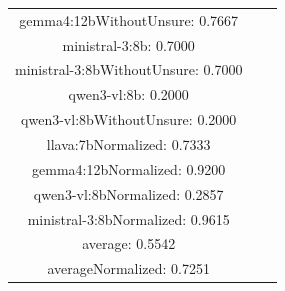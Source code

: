 \documentclass[a4paper]{article}
\begin{document}
\begin{tabular}{ccc}
gemma4:12bWithoutUnsure: 0.7667 \\ ministral-3:8b: 0.7000 \\ ministral-3:8bWithoutUnsure: 0.7000 \\ qwen3-vl:8b: 0.2000 \\ qwen3-vl:8bWithoutUnsure: 0.2000 \\ llava:7bNormalized: 0.7333 \\ gemma4:12bNormalized: 0.9200 \\ qwen3-vl:8bNormalized: 0.2857 \\ ministral-3:8bNormalized: 0.9615 \\ average: 0.5542 \\ averageNormalized: 0.7251 \end{minipage}\\
\end{tabular}

\vspace{5mm}
\end{document}
